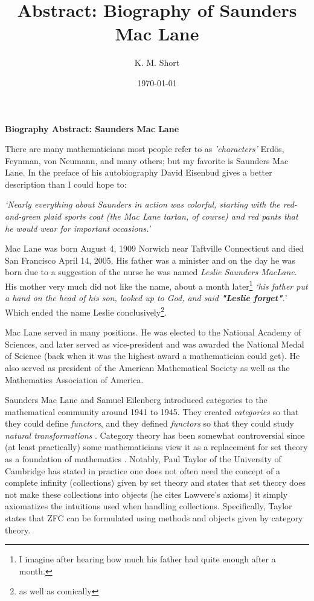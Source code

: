 \documentclass[10pt]{article}
\author{K. M. Short}
\title{Abstract: Biography of Saunders Mac Lane}
\date{\today}
\begin{document}
\begin{center}
\Large{\textbf{Biography Abstract: Saunders Mac Lane}} 
\end{center}
\vspace{0.25in}
\normalsize
There are many mathematicians most people refer to as \textit{'characters'} Erd\"{o}s, Feynman, von Neumann, and many others; but my favorite is Saunders Mac Lane. In the preface of his autobiography \cite{autobiography} David Eisenbud gives a better description than I could hope to:

\begin{center}
\textit{`Nearly everything about Saunders in action was colorful, starting with the red-and-green plaid sports coat (the Mac Lane tartan, of course) and red pants that he would wear for important occasions.'}
\end{center} 

Mac Lane was born August 4, 1909 Norwich near Taftville Connecticut and died San Francisco April 14, 2005. His father was a minister and on the day he was born due to a suggestion of the nurse he was named \textit{Leslie Saunders MacLane}. His mother very much did not like the name, about a month later\footnote{I imagine after hearing how much his father had quite enough after a month.} \textit{`his father put a hand on the head of his son, looked up to God, and said \textbf{"Leslie forget"}.}'\cite{knight} Which ended the name Leslie conclusively\footnote{as well as comically}. 

Mac Lane served in many positions. He was elected to the National Academy of Sciences, and later served as vice-president and was awarded the National Medal of Science (back when it was the highest award a mathematician could get). He also served as president of the American Mathematical Society as well as the Mathematics Association of America. 

Saunders Mac Lane and Samuel Eilenberg introduced categories to the mathematical community around 1941 to 1945. They created \emph{categories} so that they could define \emph{functors}, and they defined \textit{functors} so that they could study \textit{natural transformations} \cite{categories}. Category theory has been somewhat controversial since (at least practically) some mathematicians view it as a replacement for set theory as a foundation of mathematics \cite{taylor}. Notably, Paul Taylor of the University of Cambridge has stated in practice one does not often need the concept of a complete infinity (collections) given by set theory and states that set theory does not make these collections into objects (he cites Lawvere's axioms) it simply axiomatizes the intuitions used when handling collections. Specifically, Taylor states that ZFC can be formulated using methods and objects given by category theory. 
\end{document}
